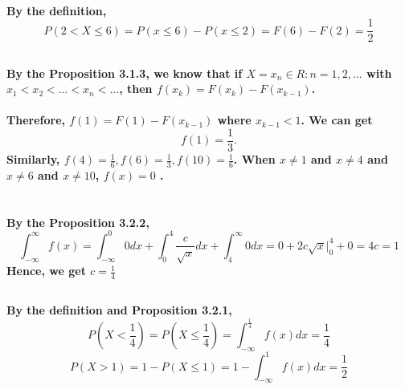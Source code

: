 \documentclass{article}
\begin{document}
            \paragraph{
                By the definition,
                $$P(2<X\leq 6)=P(x\leq 6)-P(x\leq 2)=F(6)-F(2)=\frac{1}{2}$$
            }
        \subsection{}
            \paragraph{
                By the Proposition 3.1.3, we know that if $X={x_n \in R:n=1,2,...}$ with $x_1<x_2<...<x_n<...$, then $f(x_k)=F(x_k)-F(x_{k-1})$.
            }
            \paragraph{
                Therefore, $f(1)=F(1)-F(x_{k-1})$ where $x_{k-1}<1$. We can get 
                $$f(1)=\frac{1}{3}.$$
                Similarly, $f(4)=\frac{1}{6},f(6)=\frac{1}{3},f(10)=\frac{1}{6}$.  When $x\neq 1$ and $x\neq 4$ and $x\neq 6$ and $x\neq 10$,
                $f(x)=0$ .
            }
    \section{}
        \subsection{}
            \paragraph{
                By the Proposition 3.2.2,
                $$\int _{-\infty} ^\infty f(x)=\int _{-\infty} ^0 0 dx +\int _ 0 ^4 \frac{c}{\sqrt{x}} dx + \int _4 ^\infty 0 dx=0+ 2c\sqrt{x}| _0 ^4 +0=4c=1$$
                Hence, we get $c=\frac{1}{4}$
            }
        \subsection{}
            \paragraph{
                By the definition and Proposition 3.2.1,
                $$P(X<\frac{1}{4})=P(X\leq\frac{1}{4})=\int _{-\infty}  ^\frac{1}{4}f(x)dx=\frac{1}{4}$$
                $$P(X>1)=1-P(X\leq 1)=1-\int _{-\infty}  ^1f(x)dx=\frac{1}{2}$$
            }
\end{document}
